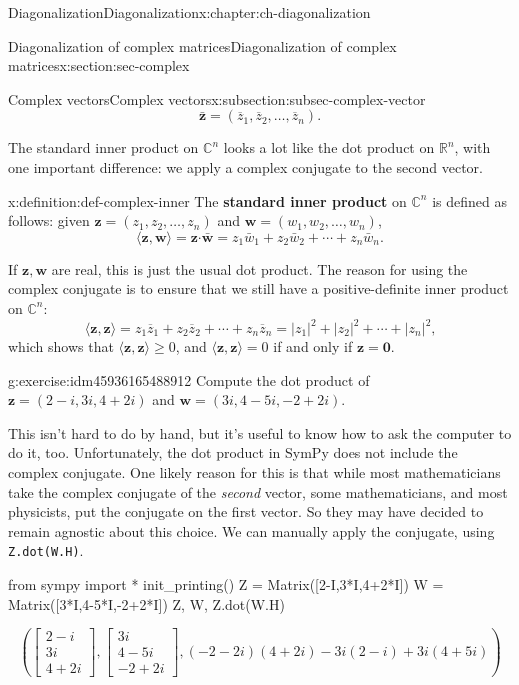 \documentclass[oneside,10pt,]{book}
\newcommand{\mono}[1]{\texttt{#1}}
\newcommand{\terminology}[1]{\textbf{#1}}
\numberwithin{equation}{section}
\newcommand{\bbm}{\begin{bmatrix}}
\newcommand{\ebm}{\end{bmatrix}}
\newcommand{\R}{\mathbb{R}}
\renewcommand{\C}{\mathbb{C}}
\newcommand{\dotp}{\!\boldsymbol{\cdot}\!}
\newcommand{\abs}[1]{\lvert #1\rvert}
\newcommand{\bz}{\overline{z}}
\newcommand{\zz}{\mathbf{z}}
\newcommand{\ww}{\mathbf{w}}
\begin{document}
\begin{chapterptx}{Diagonalization}{}{Diagonalization}{}{}{x:chapter:ch-diagonalization}
\begin{sectionptx}{Diagonalization of complex matrices}{}{Diagonalization of complex matrices}{}{}{x:section:sec-complex}
\begin{subsectionptx}{Complex vectors}{}{Complex vectors}{}{}{x:subsection:subsec-complex-vector}
\begin{equation*}
\bar{\zz} = (\bz_1,\bz_2,\ldots, \bz_n)\text{.}
\end{equation*}
%
\par
The standard inner product on \(\C^n\) looks a lot like the dot product on \(\R^n\), with one important difference: we apply a complex conjugate to the second vector.%
\begin{definition}{}{x:definition:def-complex-inner}%
The \terminology{standard inner product} on \(\C^n\) is defined as follows: given \(\zz=(z_1,z_2,\ldots, z_n)\) and \(\ww=(w_1,w_2,\ldots, w_n)\),%
\begin{equation*}
\langle \zz,\ww\rangle = \zz\dotp\bar{\ww} = z_1\bar{w}_1+z_2\bar{w}_2+\cdots + z_n\bar{w}_n\text{.}
\end{equation*}
%
\end{definition}
If \(\zz,\ww\) are real, this is just the usual dot product. The reason for using the complex conjugate is to ensure that we still have a positive-definite inner product on \(\C^n\):%
\begin{equation*}
\langle \zz,\zz\rangle = z_1\bz_1+z_2\bz_2+\cdots + z_n\bz_n = \abs{z_1}^2+\abs{z_2}^2+\cdots + \abs{z_n}^2\text{,}
\end{equation*}
which shows that \(\langle \zz,\zz\rangle \geq 0\), and \(\langle \zz,\zz\rangle = 0\) if and only if \(\zz=\mathbf{0}\).%
\begin{inlineexercise}{}{g:exercise:idm45936165488912}%
Compute the dot product of \(\zz = (2-i, 3i, 4+2i)\) and \(\ww = (3i,4-5i,-2+2i)\).%
\end{inlineexercise}%
This isn't hard to do by hand, but it's useful to know how to ask the computer to do it, too. Unfortunately, the dot product in SymPy does not include the complex conjugate. One likely reason for this is that while most mathematicians take the complex conjugate of the \emph{second} vector, some mathematicians, and most physicists, put the conjugate on the first vector. So they may have decided to remain agnostic about this choice. We can manually apply the conjugate, using \mono{Z.dot(W.H)}.%
\begin{sageinput}
from sympy import *
init_printing()
Z = Matrix([2-I,3*I,4+2*I])
W = Matrix([3*I,4-5*I,-2+2*I])
Z, W, Z.dot(W.H)
\end{sageinput}
\begin{sageoutput}
\[\left(\bbm 2-i\\3i\\4+2i\ebm, \bbm 3i\\4-5i\\-2+2i\ebm, (-2-2i)(4+2i)-3i(2-i)+3i(4+5i)\right)\]

\end{sageoutput}
\end{subsectionptx}
\end{sectionptx}
\end{chapterptx}
\end{document}

